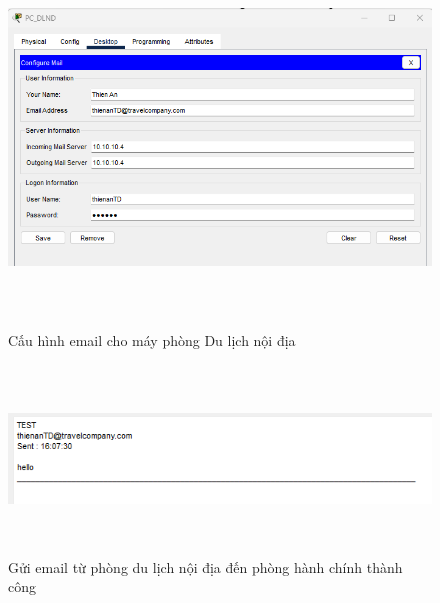 \documentclass[a4paper, 12pt]{article}
\begin{document}
\begin{figure}[H]
    \centering
    \includegraphics[width=16cm, height=10cm]{img/4.2.2c.png}
    \caption{Cấu hình email cho máy phòng Du lịch nội địa}
    \label{hinh422c}
\end{figure}

\begin{figure}[H]
    \centering
    \includegraphics[width=16cm, height=5cm]{img/4.2.2d.png}
    \caption{Gửi email từ phòng du lịch nội địa đến phòng  hành chính thành công}
    \label{hinh422d}
\end{figure}
\end{document}
